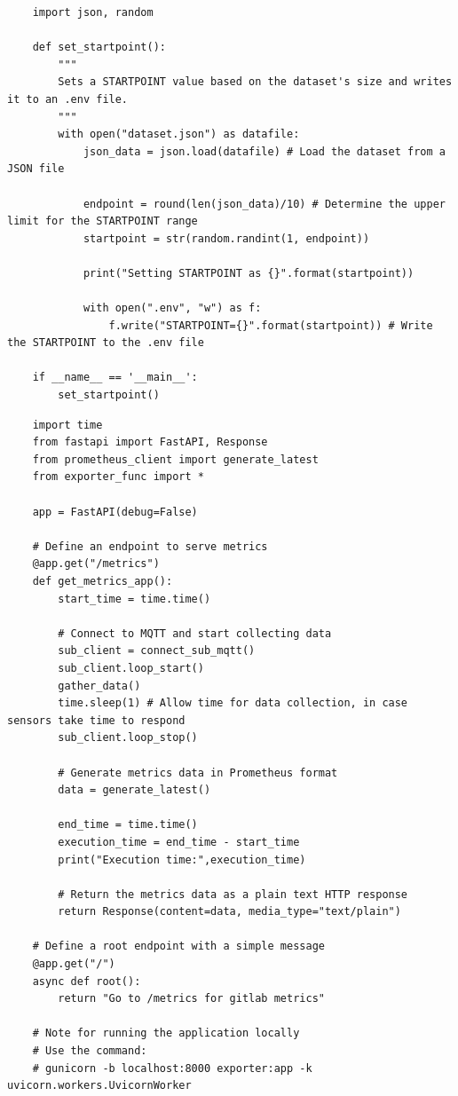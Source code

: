 \begin{verbatim}
    import json, random

    def set_startpoint():
        """
        Sets a STARTPOINT value based on the dataset's size and writes it to an .env file.
        """
        with open("dataset.json") as datafile:
            json_data = json.load(datafile) # Load the dataset from a JSON file
            
            endpoint = round(len(json_data)/10) # Determine the upper limit for the STARTPOINT range
            startpoint = str(random.randint(1, endpoint))

            print("Setting STARTPOINT as {}".format(startpoint))

            with open(".env", "w") as f:
                f.write("STARTPOINT={}".format(startpoint)) # Write the STARTPOINT to the .env file

    if __name__ == '__main__':
        set_startpoint()
\end{verbatim}

\begin{verbatim}
    import time
    from fastapi import FastAPI, Response
    from prometheus_client import generate_latest
    from exporter_func import *

    app = FastAPI(debug=False)

    # Define an endpoint to serve metrics
    @app.get("/metrics")
    def get_metrics_app():
        start_time = time.time()
        
        # Connect to MQTT and start collecting data
        sub_client = connect_sub_mqtt()
        sub_client.loop_start()
        gather_data()
        time.sleep(1) # Allow time for data collection, in case sensors take time to respond
        sub_client.loop_stop()

        # Generate metrics data in Prometheus format
        data = generate_latest()

        end_time = time.time()
        execution_time = end_time - start_time
        print("Execution time:",execution_time)

        # Return the metrics data as a plain text HTTP response
        return Response(content=data, media_type="text/plain")

    # Define a root endpoint with a simple message
    @app.get("/")
    async def root():
        return "Go to /metrics for gitlab metrics"

    # Note for running the application locally
    # Use the command:
    # gunicorn -b localhost:8000 exporter:app -k uvicorn.workers.UvicornWorker
\end{verbatim}

